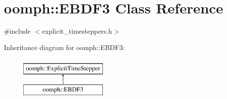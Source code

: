 \hypertarget{classoomph_1_1EBDF3}{}\section{oomph\+:\+:E\+B\+D\+F3 Class Reference}
\label{classoomph_1_1EBDF3}


{\ttfamily \#include $<$explicit\+\_\+timesteppers.\+h$>$}

Inheritance diagram for oomph\+:\+:E\+B\+D\+F3\+:\begin{figure}[H]
\begin{center}
\leavevmode
\includegraphics[height=2.000000cm]{classoomph_1_1EBDF3}
\end{center}
\end{figure}
